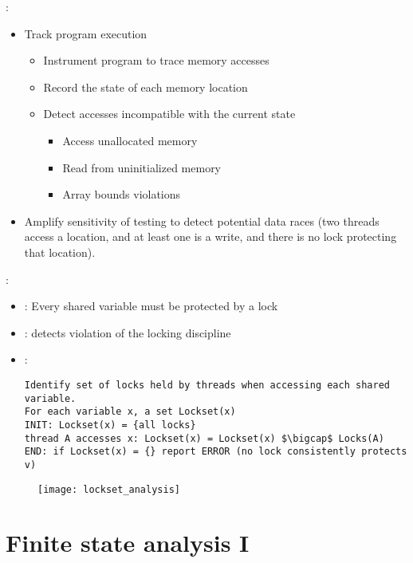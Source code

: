  :
\begin{itemize}
    \item Track program execution
    \begin{itemize}
        \item Instrument program to trace memory accesses
        \item Record the state of each memory location
        \item Detect accesses incompatible with the current state
        \begin{itemize}
            \item Access unallocated memory
            \item Read from uninitialized memory
            \item Array bounds violations
        \end{itemize}
    \end{itemize}
    \item Amplify sensitivity of testing to detect potential data races (two threads access a location, and at least one is a write, and there is no lock protecting that location).
\end{itemize}

 :
\begin{itemize}
    \item {} : Every shared variable must be protected by a lock
    \item {} : detects violation of the locking discipline
    \item {} :
    \begin{lstlisting}[style=pseudoCode]
Identify set of locks held by threads when accessing each shared variable.
For each variable x, a set Lockset(x)
INIT: Lockset(x) = {all locks}
thread A accesses x: Lockset(x) = Lockset(x) $\bigcap$ Locks(A)
END: if Lockset(x) = {} report ERROR (no lock consistently protects v)
    \end{lstlisting}
\end{itemize}

\begin{figure}[H]
    \centering
    \texttt{[image: lockset\_analysis]}
\end{figure}

\chapter{Finite state analysis I}

